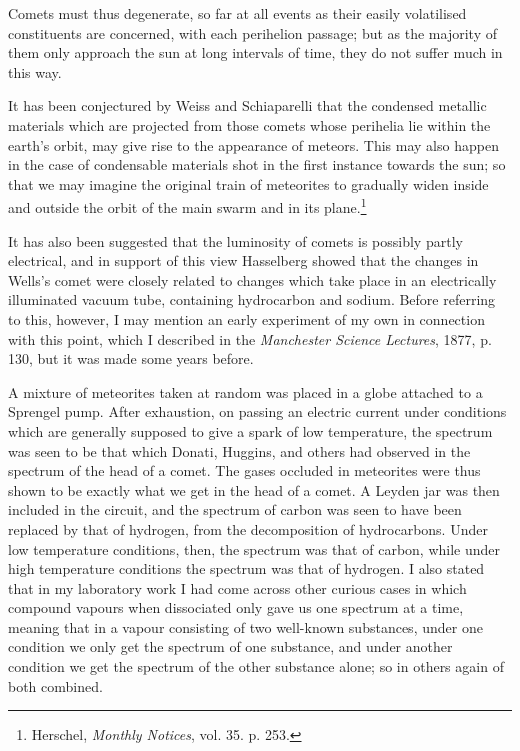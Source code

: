 \documentclass[a4paper, 12pt, oneside, polutonikogreek, english]{article}
\begin{document}
Comets must thus degenerate, so far at all events as their easily volatilised constituents are concerned, with each perihelion passage; but as the majority of them only approach the sun at long intervals of time, they do not suffer much in this way.

It has been conjectured by Weiss and Schiaparelli that the condensed metallic materials which are projected from those comets whose perihelia lie within the earth's orbit, may give rise to the appearance of meteors. This may also happen in the case of condensable materials shot in the first instance towards the sun; so that we may imagine the original train of meteorites to gradually widen inside and outside the orbit of the main swarm and in its plane.\footnote{Herschel, \emph{Monthly Notices}, vol. 35. p. 253.}

It has also been suggested that the luminosity of comets is possibly partly electrical, and in support of this view Hasselberg showed that the changes in Wells's comet were closely related to changes which take place in an electrically illuminated vacuum tube, containing hydrocarbon and sodium. Before referring to this, however, I may mention an early experiment of my own in connection with this point, which I described in the \emph{Manchester Science Lectures}, 1877, p. 130, but it was made some years before.

A mixture of meteorites taken at random was placed in a globe attached to a Sprengel pump. After exhaustion, on passing an electric current under conditions which are generally supposed to give a spark of low temperature, the spectrum was seen to be that which Donati, Huggins, and others had observed in the spectrum of the head of a comet. The gases occluded in meteorites were thus shown to be exactly what we get in the head of a comet. A Leyden jar was then included in the circuit, and the spectrum of carbon was seen to have been replaced by that of hydrogen, from the decomposition of hydrocarbons. Under low temperature conditions, then, the spectrum was that of carbon, while under high temperature conditions the spectrum was that of hydrogen. I also stated that in my laboratory work I had come across other curious cases in which compound vapours when dissociated only gave us one spectrum at a time, meaning that in a vapour consisting of two well-known substances, under one condition we only get the spectrum of one substance, and under another condition we get the spectrum of the other substance alone; so in others again of both combined.
\end{document}
